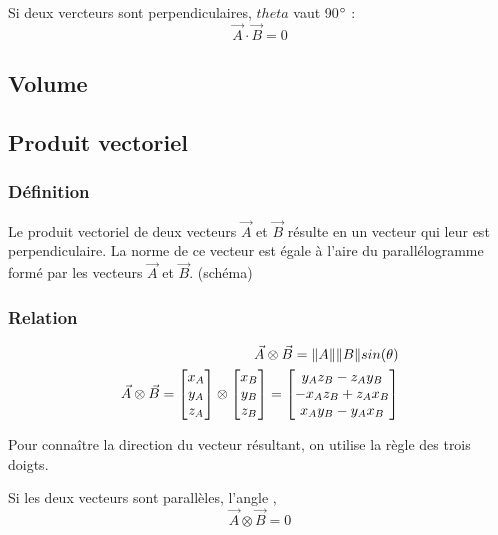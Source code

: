 Si deux vercteurs sont perpendiculaires, $theta$ vaut 90$\degree$ :
\begin{equation}
\vec{A} \cdot \vec{B}=0
\end{equation}

\subsection{Volume}

\subsection{Produit vectoriel}

\subsubsection{Définition}
Le produit vectoriel de deux vecteurs $\vec{A}$ et $\vec{B}$ résulte en un vecteur qui leur est perpendiculaire. La norme de ce vecteur est égale à l'aire du parallélogramme formé par les vecteurs $\vec{A}$ et $\vec{B}$. (schéma)
\subsubsection{Relation}
\begin{eqnarray}
\vec{A} \otimes \vec{B}=\lVert A\rVert \lVert B\rVert sin(\theta)\\
\vec{A} \otimes \vec{B}=
\begin{bmatrix}
x_A \\
y_A\\
z_A
\end{bmatrix}
\otimes
\begin{bmatrix}
x_B \\
y_B\\
z_B
\end{bmatrix}= 
\begin{bmatrix}
y_A z_B - z_A y_B \\
-x_A z_B + z_A x_B\\
x_A y_B - y_A x_B
\end{bmatrix}
\end{eqnarray}

Pour connaître la direction du vecteur résultant, on utilise la règle des trois doigts. 

Si les deux vecteurs sont parallèles, l'angle , 
\begin{equation}
\vec{A} \otimes \vec{B}=0
\end{equation}


